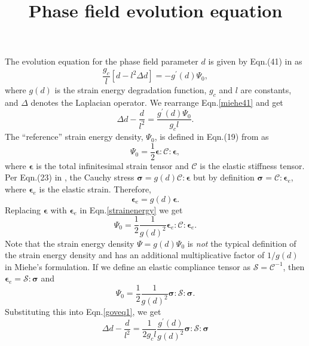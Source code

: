 \documentclass[10pt,onecolumn]{article}
\title{Phase field evolution equation}
\author{}
\date{}
\newcommand{\bs}[1]{\ensuremath{\boldsymbol{#1}}}
\newcommand{\e}{\bs{\epsilon}}
\newcommand{\s}{\bs{\sigma}}
\newcommand{\C}{\mathcal{C}}
\newcommand{\eS}{\mathcal{S}}
\begin{document}
\maketitle

The evolution equation for the phase field parameter $d$ is given by Eqn.(41) in \cite{miehe2010} as
%
\begin{equation}
\label{miehe41}
\frac{g_c}{l}\left[d-l^2\Delta d\right]=-g^\prime(d)\Psi_0,
\end{equation}
%
where $g(d)$ is the strain energy degradation function, $g_c$ and $l$ are constants, and $\Delta$ denotes the Laplacian operator. We rearrange Eqn.\eqref{miehe41} and get
%
\begin{equation}
\label{goveq1}
\Delta d-\frac{d}{l^2}=\frac{g^\prime(d)\Psi_0}{g_c l}.
\end{equation}
%
The ``reference'' strain energy density, $\Psi_0$, is defined in Eqn.(19) from \cite{miehe2010} as 
%
\begin{equation}
\label{strainenergy}
\Psi_0=\frac{1}{2} \e:\C:\e,
\end{equation}
%
where  $\e$ is the total infinitesimal strain tensor and $\C$ is the elastic stiffness tensor. Per Eqn.(23) in \cite{miehe2010}, the Cauchy stress $\s=g(d) \C:\e$ but by definition $\s=\C:\e_e$, where $\e_e$ is the elastic strain. Therefore,
%
\[\e_e=g(d)\e.\]
%
Replacing $\e$ with $\e_e$ in Eqn.\eqref{strainenergy} we get
%
\begin{equation}
\label{strainenergy2}
\Psi_0=\frac{1}{2}\frac{1}{g(d)^2}\e_e:\C:\e_e.
\end{equation}
%
Note that the strain energy density $\Psi=g(d) \Psi_0$ is \emph{not} the typical definition of the strain energy density and has an additional multiplicative factor of $1/g(d)$ in Miehe's formulation. If we define an elastic compliance tensor as $\eS=\C^{-1}$, then $\e_e=\eS:\s$ and
%
\begin{equation}
\label{strainenergy3}
\Psi_0=\frac{1}{2}\frac{1}{g(d)^2}\s:\eS:\s.
\end{equation}
%
Substituting this into Eqn.\eqref{goveq1}, we get
%
\begin{equation}
\label{goveq2}
\Delta d-\frac{d}{l^2}=\frac{1}{2g_c l}\frac{g^\prime(d)}{g(d)^2} \s:\eS:\s
\end{equation}



\end{document}
